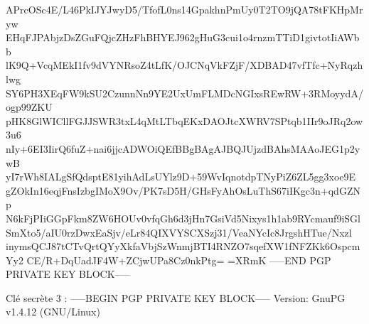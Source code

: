 \documentclass{../res/univ-projet}
\begin{document}
APrcOSc4E/L46PkIJYJwyD5/TfofL0ns14GpakhnPmUy0T2TO9jQA78tFKHpMryw
EHqFJPAbjzDsZGuFQjcZHzFhBHYEJ962gHuG3cui1o4rnzmTTiD1givtotIiAWbb
lK9Q+VcqMEkI1fv9dVYNRsoZ4tLfK/OJCNqVkFZjF/XDBAD47vfTfc+NyRqzhlwg
SY6PH3XEqFW9kSU2CzunnNn9YE2UxUmFLMDcNGIxsREwRW+3RMoyydA/ogp99ZKU
pHK8GlWICllFGJJSWR3txL4qMtLTbqEKxDAOJtcXWRV7SPtqb1IIr9oJRq2ow3u6
nIy+6EI3IirQ6fuZ+nai6jjcADWOiQEfBBgBAgAJBQJUjzdBAhsMAAoJEG1p2ywB
yI7rWh8IALgSfQdsptE81yihAdLsUYlz9D+59WvIqnotdpTNyPiZ6ZL5gg3xoe9E
gZOkIn16eqjFnsIzbgIMoX9Ov/PK7sD5H/GHsFyAhOsLuThS67iIKgc3n+qdGZNp
N6kFjPIiGGpFkm8ZW6HOUv0vfqGh6d3jHn7GsiVd5Nixys1h1ab9RYcmauf9iSGl
SmXto5/aIU0rzDwxEaSjv/eLr84QIXVYSCXSzj31/VeaNYcIc8JrgshHTue/Nxzl
inymsQCJ87tCTvQrtQYyXkfaVbjSzWnmjBTI4RNZO7sqefXW1fNFZKk6OspcmYy2
CE/R+DqUadJF4W+ZCjwUPa8Cz0nkPtg=
=XRmK
-----END PGP PRIVATE KEY BLOCK-----



Clé secrète 3 :
-----BEGIN PGP PRIVATE KEY BLOCK-----
Version: GnuPG v1.4.12 (GNU/Linux)
\end{document}
